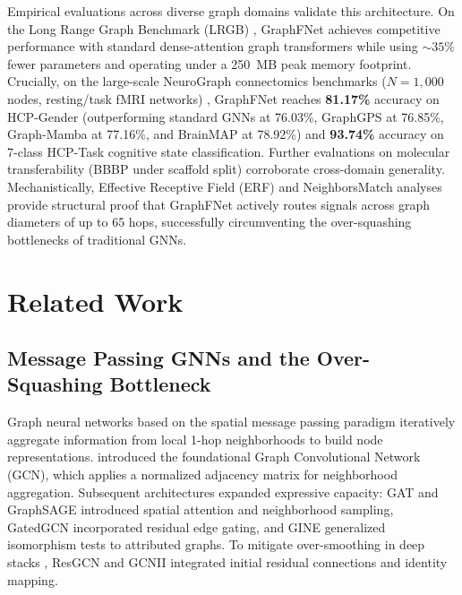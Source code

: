 \documentclass[10pt]{article}
\begin{document}
Empirical evaluations across diverse graph domains validate this architecture. On the Long Range Graph Benchmark (LRGB) \citep{dwivedi2022long}, GraphFNet achieves competitive performance with standard dense-attention graph transformers while using ${\sim}35\%$ fewer parameters and operating under a 250~MB peak memory footprint. Crucially, on the large-scale NeuroGraph connectomics benchmarks ($N=1,000$ nodes, resting/task fMRI networks) \citep{said2023neurograph}, GraphFNet reaches \textbf{81.17\%} accuracy on HCP-Gender (outperforming standard GNNs at 76.03\%, GraphGPS at 76.85\%, Graph-Mamba at 77.16\%, and BrainMAP at 78.92\%) and \textbf{93.74\%} accuracy on 7-class HCP-Task cognitive state classification. Further evaluations on molecular transferability (BBBP under scaffold split) corroborate cross-domain generality. Mechanistically, Effective Receptive Field (ERF) and NeighborsMatch \citep{alon2021bottleneck} analyses provide structural proof that GraphFNet actively routes signals across graph diameters of up to 65 hops, successfully circumventing the over-squashing bottlenecks of traditional GNNs.

\section{Related Work}

\subsection{Message Passing GNNs and the Over-Squashing Bottleneck}
Graph neural networks based on the spatial message passing paradigm \citep{gilmer2017neural} iteratively aggregate information from local 1-hop neighborhoods to build node representations. \citet{kipf2017gcn} introduced the foundational Graph Convolutional Network (GCN), which applies a normalized adjacency matrix for neighborhood aggregation. Subsequent architectures expanded expressive capacity: GAT \citep{velickovic2018graph} and GraphSAGE \citep{hamilton2017inductive} introduced spatial attention and neighborhood sampling, GatedGCN \citep{bresson2017residual} incorporated residual edge gating, and GINE \citep{hu2020strategies} generalized isomorphism tests to attributed graphs. To mitigate over-smoothing in deep stacks \citep{oono2019graph}, ResGCN and GCNII \citep{chen2020simple} integrated initial residual connections and identity mapping.
\end{document}
